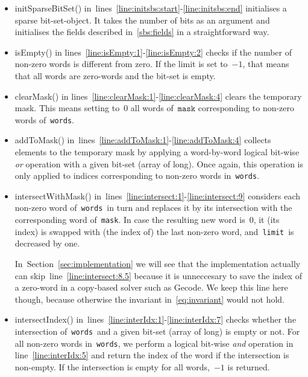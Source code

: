 \documentclass[a4paper,11pt]{article}
\newcommand{\Secref}[1]{Section~\ref{#1}}
\newcommand{\lineref}[1]{line~\ref{#1}}
\newcommand{\linesref}[2]{lines~\ref{#1}-\ref{#2}}
\newcommand{\Eqref}[1]{\eqref{#1}}
\newcommand{\Words}{\texttt{words}}
\newcommand{\Mask}{\texttt{mask}}
\newcommand{\Limit}{\texttt{limit}}
\numberwithin{equation}{section}
\begin{document}
\begin{itemize}
  \item initSparseBitSet() in~\linesref{line:initsbs:start}{line:initsbs:end}
    initialises a sparse bit-set-object. It takes 
    the number of bits as an argument and initialises the fields
    described in~\ref{sbs:fields} in a straightforward way.

  \item isEmpty() in lines~\ref{line:isEmpty:1}-\ref{line:isEmpty:2} checks
    if the number of non-zero words is different from zero. If the limit is
    set to~$-1$, that means that all words are zero-words and the bit-set
    is empty.

  \item clearMask() in lines~\ref{line:clearMask:1}-\ref{line:clearMask:4}
    clears the temporary mask. This means setting to~$0$ all words of~$\Mask$
    corresponding to non-zero words of~\Words.

  \item addToMask() in~\linesref{line:addToMask:1}{line:addToMask:4} collects
    elements to the temporary mask by applying a word-by-word logical bit-wise
    \emph{or} operation with a given bit-set (array of long).
    Once again, this operation is only applied to indices corresponding to
    non-zero words in~\Words.

  \item intersectWithMask() in~\linesref{line:intersect:1}{line:intersect:9}
    considers each non-zero word of~\Words~in turn
    and replaces it by its intersection with the corresponding word of~\Mask.
    In case the resulting new word is~$0$, it (its index) is swapped with
    (the index of) the last non-zero word, and~\Limit~is
    decreased by one.
    
    In~\Secref{sec:implementation} we will see that the implementation
    actually can skip~\lineref{line:intersect:8.5} because it is unneccesary
    to save the index of a zero-word in a copy-based solver such as Gecode.
    We keep this
    line here though, because otherwise the invariant in~\Eqref{eq:invariant} 
    would not hold.
    
  \item intersectIndex() in~\linesref{line:interIdx:1}{line:interIdx:7}
    checks whether the intersection of~\Words~and a given bit-set
    (array of long) is empty or not. For all non-zero words in~\Words,
    we perform a logical bit-wise \emph{and} operation 
    in line~\ref{line:interIdx:5} and return
    the index of the word if the intersection is non-empty. If the
    intersection is empty for all words,~$-1$ is returned.
\end{itemize}
\end{document}
